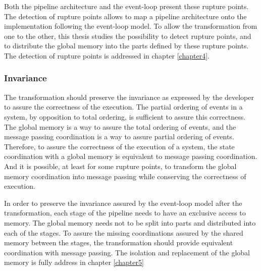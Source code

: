 Both the pipeline architecture and the event-loop present these rupture points.
The detection of rupture points allows to map a pipeline architecture onto the implementation following the event-loop model.
To allow the transformation from one to the other, this thesis studies the possibility to detect rupture points, and to distribute the global memory into the parts defined by these rupture points.
The detection of rupture points is addressed in chapter \ref{chapter4}.

\subsubsection{Invariance}


The transformation should preserve the invariance as expressed by the developer to assure the correctness of the execution.
The partial ordering of events in a system, by opposition to total ordering, is sufficient to assure this correctness.
The global memory is a way to assure the total ordering of events, and the message passing coordination is a way to assure partial ordering of events.
Therefore, to assure the correctness of the execution of a system, the state coordination with a global memory is equivalent to message passing coordination.
And it is possible, at least for some rupture points, to transform the global memory coordination into message passing while conserving the correctness of execution.

In order to preserve the invariance assured by the event-loop model after the transformation, each stage of the pipeline needs to have an exclusive access to memory.
The global memory needs not to be split into parts and distributed into each of the stages.
To assure the missing coordinations assured by the shared memory between the stages, the transformation should provide equivalent coordination with message passing.
The isolation and replacement of the global memory is fully address in chapter \ref{chapter5}


